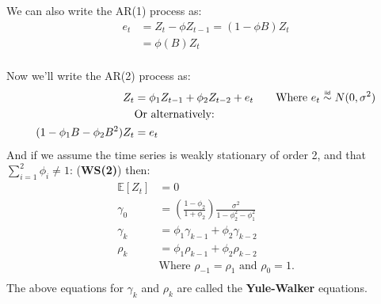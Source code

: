 We can also write the AR(1) process as:
\begin{equation*}
    \begin{aligned}
        e_{t} &= Z_{t} - \phi Z_{t-1} = (1 - \phi B) Z_{t}\\ 
        &= \phi(B)Z_{t} \\ 
    \end{aligned}
\end{equation*}


Now we'll write the AR(2) process as:
\begin{equation*}
    \begin{aligned}
        Z_{t} &= \phi_{1}Z_{t-1} + \phi_{2}Z_{t-2} + e_t \qquad \text{Where $e_t
        \iid N(0, \sigma^2)$} \\
              &\text{Or alternatively:}\\
            (1 - \phi_{1}B - \phi_{2}B^{2})Z_{t} &= e_{t} \\
    \end{aligned}
\end{equation*}
And if we assume the time series is weakly stationary of order 2, and that
$\sum_{i=1}^{2} \phi_{i} \ne 1$: 
(\textbf{WS(2)}) then:
\begin{equation*}
    \begin{aligned}
        \mathbb{E}[Z_{t}] &= 0 \\
        \gamma_{0} &= \left( \frac{1 - \phi_{2}}{1 + \phi_{2}} \right) \frac{\sigma^{2}}{1 - \phi^{2}_{2} - \phi_{1}^{2}} \\
        \gamma_{k} &= \phi_{1}\gamma_{k-1} + \phi_{2}\gamma_{k-2} \\
        \rho_{k} &= \phi_{1}\rho_{k-1} + \phi_{2}\rho_{k-2} \\
                          &\text{Where $\rho_{-1} = \rho_{1}$ and $\rho_{0}=1$.}\\
   \end{aligned}
\end{equation*}
The above equations for $\gamma_{k}$ and $\rho_{k}$ are called the
\textbf{Yule-Walker} equations.

